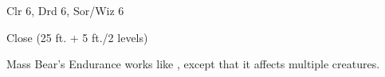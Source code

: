 
\begin{description*}
\item[Level:] Clr 6, Drd 6, Sor/Wiz 6
\item[Range:] Close (25 ft. + 5 ft./2 levels)
\end{description*}

Mass Bear's Endurance works like , except that
it affects multiple creatures.